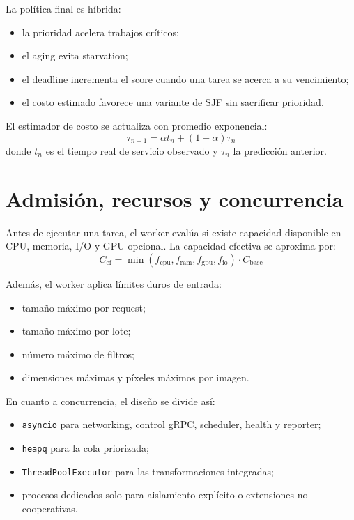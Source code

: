 \documentclass[conference]{IEEEtran}
\begin{document}
La política final es híbrida:
\begin{itemize}[leftmargin=*]
\item la prioridad acelera trabajos críticos;
\item el aging evita starvation;
\item el deadline incrementa el score cuando una tarea se acerca a su vencimiento;
\item el costo estimado favorece una variante de SJF sin sacrificar prioridad.
\end{itemize}

El estimador de costo se actualiza con promedio exponencial:
\begin{equation}
\tau_{n+1} = \alpha t_n + (1-\alpha)\tau_n
\end{equation}
donde $t_n$ es el tiempo real de servicio observado y $\tau_n$ la predicción anterior.

\section{Admisión, recursos y concurrencia}
Antes de ejecutar una tarea, el worker evalúa si existe capacidad disponible en CPU, memoria, I/O y GPU opcional. La capacidad efectiva se aproxima por:
\begin{equation}
\label{eq:capacity}
C_{\text{ef}} = \min(f_{\text{cpu}}, f_{\text{ram}}, f_{\text{gpu}}, f_{\text{io}})\cdot C_{\text{base}}
\end{equation}

Además, el worker aplica límites duros de entrada:
\begin{itemize}[leftmargin=*]
\item tamaño máximo por request;
\item tamaño máximo por lote;
\item número máximo de filtros;
\item dimensiones máximas y píxeles máximos por imagen.
\end{itemize}

En cuanto a concurrencia, el diseño se divide así:
\begin{itemize}[leftmargin=*]
\item \texttt{asyncio} para networking, control gRPC, scheduler, health y reporter;
\item \texttt{heapq} para la cola priorizada;
\item \texttt{ThreadPoolExecutor} para las transformaciones integradas;
\item procesos dedicados solo para aislamiento explícito o extensiones no cooperativas.
\end{itemize}
\end{document}
